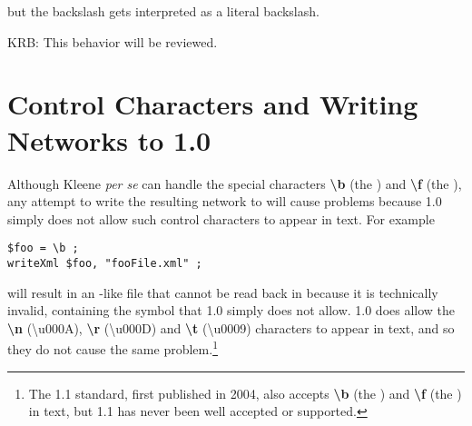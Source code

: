 \noindent

but the backslash gets interpreted as a literal backslash.  

KRB:  This
behavior will be reviewed.

\section{Control Characters and Writing Networks to  1.0}

Although Kleene \emph{per se} can handle the special characters
\textbf{\textbackslash{}b} (the ) and
\textbf{\textbackslash{}f} (the ), any attempt to write
the resulting network to  will cause problems because
 1.0 simply does not allow such control characters to appear in
 text.  For example

\begin{Verbatim}[fontsize=\small]
$foo = \b ;
writeXml $foo, "fooFile.xml" ;
\end{Verbatim}

\noindent
will result in an -like file that cannot be read back in
because it is technically invalid, containing the  symbol
that  1.0 simply does not allow.   1.0 does allow the
\textbf{\textbackslash{}n} (\textbackslash{}u000A),
\textbf{\textbackslash{}r} (\textbackslash{}u000D) and
\textbf{\textbackslash{}t} (\textbackslash{}u0009) characters to appear
in text, and so they do not cause the same problem.\footnote{The
 1.1 standard, first published in 2004, also accepts
\textbf{\textbackslash{}b} (the ) and
\textbf{\textbackslash{}f} (the ) in  text, but
 1.1 has never been well accepted or supported.}



